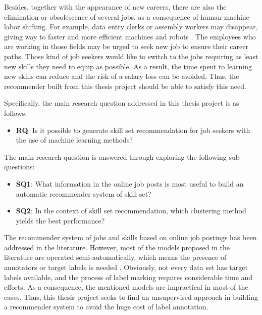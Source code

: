 \documentclass[a4paper,man,floatsintext,natbib,noextraspace]{apa6}
\begin{document}
Besides, together with the appearance of new careers, there are also the elimination or obsolescence of several jobs, as a consequence of human-machine labor shifting. For example, data entry clerks or assembly workers may disappear, giving way to faster and more efficient machines and robots \citep{worldeconomicforumFutureJobsReport2020}. The employees who are working in those fields may be urged to seek new job to ensure their career paths. Those kind of job seekers would like to switch to the jobs requiring as least new skills they need to equip as possible. As a result, the time spent to learning new skills can reduce and the risk of a salary loss can be avoided. Thus, the recommender built from this thesis project should be able to satisfy this need.

Specifically, the main research question addressed in this thesis project is as follows: 

\begin{itemize}
    \item \textbf{RQ}: Is it possible to generate skill set recommendation for job seekers with the use of machine learning methods? 
\end{itemize}

The main research question is answered through exploring the following sub-questions:

\begin{itemize}
    \item \textbf{SQ1}: What information in the online job posts is most useful to build an automatic recommender system of skill set?
    \item \textbf{SQ2}: In the context of skill set recommendation, which clustering method yields the best performance?
\end{itemize}

The recommender system of jobs and skills based on online job postings has been addressed in the literature. However, most of the models proposed in the literature are operated semi-automatically, which means the presence of annotators or target labels is needed \citep{calancaResponsibleTeamPlayers2019, daveCombinedRepresentationLearning2018, demauroHumanResourcesBig2018, djumalievaClassifyingOccupationsAccording2018, mhamdiJobRecommendationBased2020}. Obviously, not every data set has target labels available, and the process of label marking requires considerable time and efforts. As a consequence, the mentioned models are impractical in most of the cases. Thus, this thesis project seeks to find an unsupervised approach in building a recommender system to avoid the huge cost of label annotation.
\end{document}
